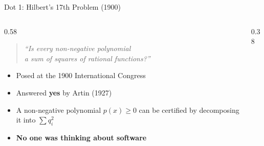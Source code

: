 \documentclass[aspectratio=169]{beamer}
\begin{document}
\begin{frame}{Dot 1: Hilbert's 17th Problem (1900)}
\begin{columns}[c]
\begin{column}{0.58\textwidth}
\begin{quote}
\large\textit{``Is every non-negative polynomial\\a sum of squares of rational functions?''}
\end{quote}
\vspace{0.5em}
\begin{itemize}
  \item Posed at the 1900 International Congress
  \item Answered \textbf{yes} by Artin (1927)
  \item A non-negative polynomial $p(x) \ge 0$ can be certified by decomposing it into $\sum q_i^2$
  \item \textbf{No one was thinking about software}
\end{itemize}
\end{column}
\begin{column}{0.38\textwidth}
\centering
{}
\end{column}
\end{columns}
\end{frame}

\end{document}

